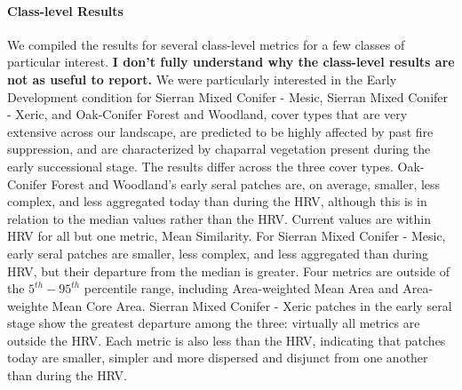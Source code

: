 %

\paragraph{Class-level Results} We compiled the results for several class-level metrics for a few classes of particular interest. \textbf{I don't fully understand why the class-level results are not as useful to report.} We were particularly interested in the Early Development condition for Sierran Mixed Conifer - Mesic, Sierran Mixed Conifer - Xeric, and Oak-Conifer Forest and Woodland, cover types that are very extensive across our landscape, are predicted to be highly affected by past fire suppression, and are characterized by chaparral vegetation present during the early successional stage. The results differ across the three cover types. Oak-Conifer Forest and Woodland's early seral patches are, on average, smaller, less complex, and less aggregated today than during the HRV, although this is in relation to the median values rather than the HRV. Current values are within HRV for all but one metric, Mean Similarity. For Sierran Mixed Conifer - Mesic, early seral patches are smaller, less complex, and less aggregated than during HRV, but their departure from the median is greater. Four metrics are outside of the $5^{th}-95^{th}$ percentile range, including Area-weighted Mean Area and Area-weighte Mean Core Area. Sierran Mixed Conifer - Xeric patches in the early seral stage show the greatest departure among the three: virtually all metrics are outside the HRV. Each metric is also less than the HRV, indicating that patches today are smaller, simpler and more dispersed and disjunct from one another than during the HRV.

